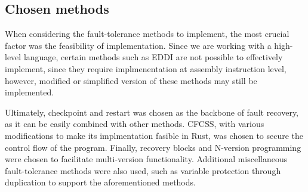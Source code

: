 \subsection{Chosen methods}

When considering the fault-tolerance methods to implement, the most crucial factor was the feasibility of implementation. Since we are working with a high-level language, certain methods such as EDDI are not possible to effectively implement, since they require implmenentation at assembly instruction level, however, modified or simplified version of these methods may still be implemented.

Ultimately, checkpoint and restart was chosen as the backbone of fault recovery, as it can be easily combined with other methods. CFCSS, with various modifications to make its implmentation fasible in Rust, was chosen to secure the control flow of the program. Finally, recovery blocks and N-version programming were chosen to facilitate multi-version functionality. Additional miscellaneous fault-tolerance methods were also used, such as variable protection through duplication to support the aforementioned methods.